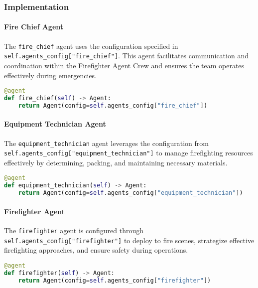 \subsubsection{Implementation}

\paragraph{Fire Chief Agent}
The \texttt{fire\_chief} agent uses the configuration specified in \newline \texttt{self.agents\_config["fire\_chief"]}. This agent facilitates communication and coordination within the Firefighter Agent Crew and ensures the team operates effectively during emergencies.

\begin{lstlisting}[language=Python]
@agent
def fire_chief(self) -> Agent:
    return Agent(config=self.agents_config["fire_chief"])
\end{lstlisting}

\paragraph{Equipment Technician Agent}
The \texttt{equipment\_technician} agent leverages the configuration from \newline \texttt{self.agents\_config["equipment\_technician"]} to manage firefighting resources effectively by determining, packing, and maintaining necessary materials.

\begin{lstlisting}[language=Python]
@agent
def equipment_technician(self) -> Agent:
    return Agent(config=self.agents_config["equipment_technician"])
\end{lstlisting}

\paragraph{Firefighter Agent}
The \texttt{firefighter} agent is configured through \newline \texttt{self.agents\_config["firefighter"]} to deploy to fire scenes, strategize effective firefighting approaches, and ensure safety during operations.

\begin{lstlisting}[language=Python]
@agent
def firefighter(self) -> Agent:
    return Agent(config=self.agents_config["firefighter"])
\end{lstlisting}

